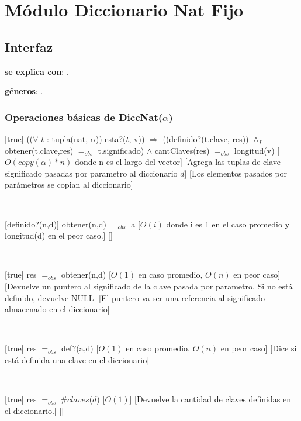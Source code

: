 \section{Módulo Diccionario Nat Fijo}

\subsection{Interfaz}

\textbf{se explica con}: .

\textbf{géneros}: .

\subsubsection{Operaciones básicas de DiccNat($\alpha$)}

[true]
{(($\forall$ $t$ : tupla(nat, $\alpha$)) esta?($t$, v)) $\Rightarrow$ ((definido?(t.clave, res))
	$\land_L$ obtener(t.clave,res) $=_{obs}$ t.significado) $\land$ cantClaves(res) $=_{obs}$ longitud(v)}
[$O(copy(\alpha) * n)$ donde n es el largo del vector]
[Agrega las tuplas de clave-significado pasadas por parametro al diccionario $d$]
[Los elementos pasados por parámetros se copian al diccionario]

~

[definido?(n,d)]
{obtener(n,d) $=_{obs}$ a}
[$O(i)$ donde i es 1 en el caso promedio y longitud(d) en el peor caso.]
[]

~

[true]
{res $=_{obs}$ obtener(n,d)}
[$O(1)$ en caso promedio, $O(n)$ en peor caso]
[Devuelve un puntero al significado de la clave pasada por parametro. Si no está definido, devuelve NULL]
[El puntero va ser una referencia al significado almacenado en el diccionario]

~

[true]
{res $=_{obs}$ def?(a,d)}
[$O(1)$ en caso promedio, $O(n)$ en peor caso]
[Dice si está definida una clave en el diccionario]
[]

~

[true]
{res $=_{obs} \ \# claves$($d$)}
[$O(1)$]
[Devuelve la cantidad de claves definidas en el diccionario.]
[]

